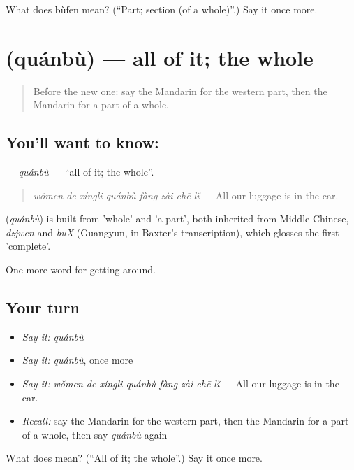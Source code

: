 \begin{tcolorbox}[breakable,colback=teal!4,colframe=teal!35!black,title={Before you move on}]
What does bùfen mean? (\textquotedblleft{}Part; section (of a whole)\textquotedblright{}.) Say it once more.
\end{tcolorbox}
\section[\texorpdfstring{\zh{全部} (quánbù)}{全部 (quánbù)}]{ (quánbù) — all of it; the whole}

\label{lesson:ZH-C438-quanbu}



\begin{quote}
Before the new one: say the Mandarin for the western part, then the Mandarin for a part of a whole.
\end{quote}

\subsection*{You'll want to know: }
\textbf{} — \emph{quánbù} — \textquotedblleft{}all of it; the whole\textquotedblright{}.

\begin{quote}
\emph{wǒmen de xíngli quánbù fàng zài chē lǐ} — All our luggage is in the car.
\end{quote}

\begin{cousinweb}
\textbf{} (\emph{quánbù}) is built from  'whole' and  'a part', both inherited from Middle Chinese, \emph{dzjwen} and \emph{buX} (Guangyun, in Baxter's transcription), which glosses the first 'complete'.
\end{cousinweb}

\begin{grammarlens}[title={What you've built}]
One more word for getting around.
\end{grammarlens}

\subsection*{Your turn}
\begin{itemize}
\raggedright
  \item \emph{Say it:} \emph{quánbù}
  \item \emph{Say it:} \emph{quánbù}, once more
  \item \emph{Say it:} \emph{wǒmen de xíngli quánbù fàng zài chē lǐ} — All our luggage is in the car.
  \item \emph{Recall:} say the Mandarin for the western part, then the Mandarin for a part of a whole, then say \emph{quánbù} again
\end{itemize}

\begin{tcolorbox}[breakable,colback=teal!4,colframe=teal!35!black,title={Before you move on}]
What does  mean? (\textquotedblleft{}All of it; the whole\textquotedblright{}.) Say it once more.
\end{tcolorbox}

